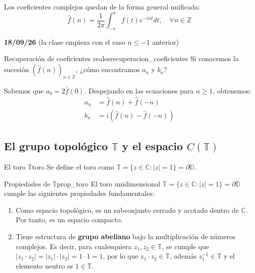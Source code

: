 Los coeficientes complejos quedan de la forma general unificada:
\begin{equation*}
    \hat{f}(n) = \frac{1}{2\pi} \int_{-\pi}^{\pi} f(t) e^{-int} dt, \quad \forall n \in \mathbb{Z}
\end{equation*}

\textbf{18/09/26} (la clase empieza con el caso $n \le -1$ anterior)

\begin{observacion}{Recuperación de coeficientes reales}{recuperacion_coeficientes}
Si conocemos la sucesión $(\hat{f}(n))_{n \in \mathbb{Z}}$, ¿cómo encontramos $a_n$ y $b_n$?  

Sabemos que $a_0 = 2\hat{f}(0)$. Despejando en las ecuaciones para $n \ge 1$, obtenemos:
\begin{align*}
    a_n &= \hat{f}(n) + \hat{f}(-n) \\
    b_n &= i(\hat{f}(n) - \hat{f}(-n))
\end{align*}
\end{observacion}

\subsection{El grupo topológico $\mathbb{T}$ y el espacio $C(\mathbb{T})$}

\begin{definicion}{El toro $\mathbb{T}$}{toro}
Se define el toro como $\mathbb{T} = \{z \in \mathbb{C} : |z|=1\} = \partial \mathbb{D}$.
\end{definicion}

\begin{observacion}{Propiedades de $\mathbb{T}$}{prop_toro}
El toro unidimensional $\mathbb{T} = \{z \in \mathbb{C} : |z|=1\} = \partial\mathbb{D}$ cumple las siguientes propiedades fundamentales:
\begin{enumerate}
    \item Como espacio topológico, es un subconjunto cerrado y acotado dentro de $\mathbb{C}$. Por tanto, es un espacio compacto.
    \item Tiene estructura de \textbf{grupo abeliano} bajo la multiplicación de números complejos. Es decir, para cualesquiera $z_1, z_2 \in \mathbb{T}$, se cumple que $|z_1 \cdot z_2| = |z_1| \cdot |z_2| = 1 \cdot 1 = 1$, por lo que $z_1 \cdot z_2 \in \mathbb{T}$, además $z_1^{-1} \in \mathbb{T}$ y el elemento neutro es $1 \in \mathbb{T}$.
\end{enumerate}
\end{observacion}

